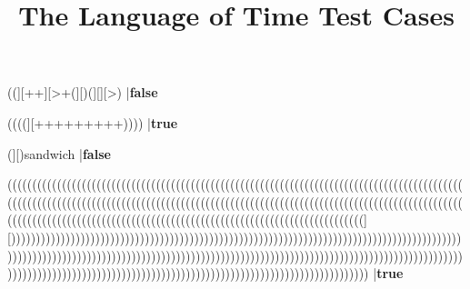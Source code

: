 \documentclass{../../codeproblem}
\begin{document}
\title{The Language of Time Test Cases}

\begin{example}
((][++][>+(][)(][][>(][){
|\textbf{true}\end{example}

\begin{example}
((][++][>+(][)(][][>)
|\textbf{false}\end{example}

\begin{example}
((((][+++++++++))))
|\textbf{true}\end{example}

\begin{example}
(][)sandwich
|\textbf{false}\end{example}

\begin{example}
((((((((((((((((((((((((((((((((((((((((((((((((((((((((((((((((((((((((((((((((((((((((((((((((((((((((((((((((((((((((((((((((((((((((((((((((((((((((((((((((((((((((((((((((((((((((((((((((((((((((((((((((((((((((((((((((((((((((((((((((((((((((((((((((][))))))))))))))))))))))))))))))))))))))))))))))))))))))))))))))))))))))))))))))))))))))))))))))))))))))))))))))))))))))))))))))))))))))))))))))))))))))))))))))))))))))))))))))))))))))))))))))))))))))))))))))))))))))))))))))))))))))))))))))))))))))))))))))))
|\textbf{true}\end{example}
\end{document}
